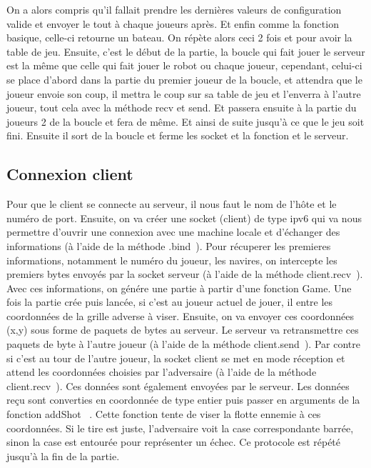 \documentclass{article}
\begin{document}
	On a alors compris qu’il fallait prendre les dernières valeurs de configuration valide et envoyer le tout à chaque joueurs après.
	\newline Et enfin comme la fonction basique, celle-ci retourne un bateau. On répète alors ceci 2 fois et pour avoir la table de jeu.
	Ensuite, c’est le début de la partie, la boucle qui fait jouer le serveur est la même que celle qui fait jouer le robot ou chaque joueur, cependant, celui-ci se place d’abord dans la partie du premier joueur de la boucle, et attendra que le joueur envoie son coup, il mettra le coup sur sa table de jeu et  l’enverra à l’autre joueur, tout cela avec la méthode recv et send. Et passera ensuite à la partie du joueurs 2 de la boucle et fera de même. Et ainsi de suite jusqu’à ce que le jeu soit fini. Ensuite il sort de la boucle et ferme les socket et la fonction et le serveur.

	\subsection{Connexion client}
	Pour que le client se connecte au serveur, il nous faut le nom de l'h\^ote et le num\'ero de port.
	\newline Ensuite, on va cr\'eer une socket (client) de type ipv6 qui va nous permettre d'ouvrir une connexion avec une machine locale et d'\'echanger des informations (\`a l'aide de la m\'ethode  \guillemotleft .bind\guillemotright\ ).
	\newline Pour r\'ecuperer les premieres informations, notamment le num\'ero du joueur, les navires, on intercepte les premiers bytes envoy\'es par la socket serveur (\`a l'aide de la m\'ethode \guillemotleft client.recv\guillemotright\ ).
	\newline Avec ces informations, on g\'en\'ere une partie \`a partir d'une fonction Game.
	\newline Une fois la partie cr\'ee puis lanc\'ee, si c'est au joueur actuel de jouer, il entre les coordonn\'ees de la grille adverse \`a viser. Ensuite, on va envoyer ces coordonn\'ees (x,y) sous forme de paquets de bytes au serveur. Le serveur va retransmettre ces paquets de byte \`a l'autre joueur (\`a l'aide de la m\'ethode \guillemotleft client.send\guillemotright\ ).
	\newline Par contre si c'est au tour de l'autre joueur, la socket client se met en mode r\'eception et attend les coordonn\'ees choisies par l'adversaire (\`a l'aide de la m\'ethode \guillemotleft client.recv\guillemotright\ ). Ces donn\'ees sont \'egalement envoy\'ees par le serveur. 
	\newline Les donn\'ees re\c cu sont converties en coordonn\'ee de type entier puis passer en arguments de la fonction \guillemotleft addShot \guillemotright\ . Cette fonction tente de viser la flotte ennemie \`a ces coordonn\'ees. Si le tire est juste, l'adversaire voit la case correspondante barr\'ee, sinon la case est entour\'ee pour repr\'esenter un \'echec.    
	\newline Ce protocole est r\'ep\'et\'e jusqu'\`a la fin de la partie.
\end{document}
